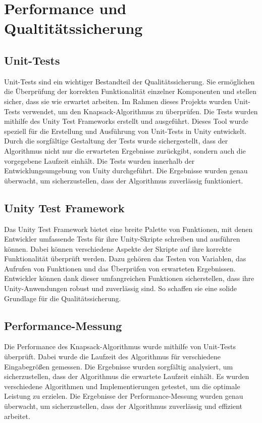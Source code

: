 \section{Performance und Qualtitätssicherung} 
\subsection{Unit-Tests}
Unit-Tests sind ein wichtiger Bestandteil der Qualitätssicherung. Sie ermöglichen die Überprüfung der korrekten
Funktionalität einzelner Komponenten und stellen sicher, dass sie wie erwartet arbeiten. Im Rahmen dieses Projekts wurden
Unit-Tests verwendet, um den Knapsack-Algorithmus zu überprüfen.  Die Tests wurden mithilfe des Unity Test Frameworks
erstellt und ausgeführt. Dieses Tool wurde speziell für die Erstellung und Ausführung von Unit-Tests in Unity entwickelt.
Durch die sorgfältige Gestaltung der Tests wurde sichergestellt, dass der Algorithmus nicht nur die erwarteten Ergebnisse
zurückgibt, sondern auch die vorgegebene Laufzeit einhält. Die Tests wurden innerhalb der Entwicklungsumgebung von Unity
durchgeführt. Die Ergebnisse wurden genau überwacht, um sicherzustellen, dass der Algorithmus zuverlässig funktioniert.

\subsection{Unity Test Framework}
Das Unity Test Framework bietet eine breite Palette von Funktionen, mit denen Entwickler umfassende Tests für ihre
Unity-Skripte schreiben und ausführen können. Dabei können verschiedene Aspekte der Skripte auf ihre korrekte Funktionalität
überprüft werden. Dazu gehören das Testen von Variablen, das Aufrufen von Funktionen und das Überprüfen von erwarteten
Ergebnissen. Entwickler können dank dieser umfangreichen Funktionen sicherstellen, dass ihre Unity-Anwendungen robust
und zuverlässig sind. So schaffen sie eine solide Grundlage für die Qualitätssicherung.

\subsection{Performance-Messung}
Die Performance des Knapsack-Algorithmus wurde mithilfe von Unit-Tests überprüft. Dabei wurde die Laufzeit des Algorithmus
für verschiedene Eingabegrößen gemessen. Die Ergebnisse wurden sorgfältig analysiert, um sicherzustellen, dass der Algorithmus
die erwartete Laufzeit einhält. Es wurden verschiedene Algorithmen und Implementierungen getestet, um die optimale
Leistung zu erzielen. Die Ergebnisse der Performance-Messung wurden genau überwacht, um sicherzustellen, dass der
Algorithmus zuverlässig und effizient arbeitet.

